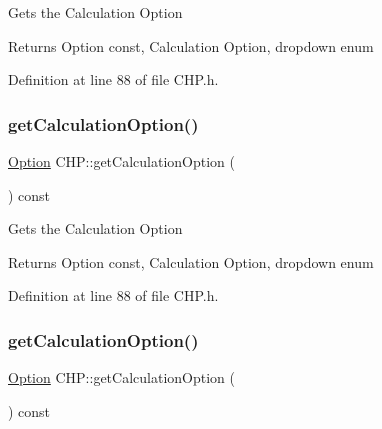 Gets the Calculation Option

\begin{DoxyReturn}{Returns}
Option const, Calculation Option, dropdown enum 
\end{DoxyReturn}


Definition at line 88 of file C\+H\+P.\+h.

\mbox{\label{class_c_h_p_a858f0201818f637331e0d06d3171bee7}} 
\subsubsection{\texorpdfstring{get\+Calculation\+Option()}{getCalculationOption()}\hspace{0.1cm}{\footnotesize\ttfamily [2/3]}}
{\footnotesize\ttfamily \hyperlink{class_c_h_p_ac82f530412021ace928a7e95c1295d06}{Option} C\+H\+P\+::get\+Calculation\+Option (\begin{DoxyParamCaption}{ }\end{DoxyParamCaption}) const\hspace{0.3cm}{\ttfamily [inline]}}

Gets the Calculation Option

\begin{DoxyReturn}{Returns}
Option const, Calculation Option, dropdown enum 
\end{DoxyReturn}


Definition at line 88 of file C\+H\+P.\+h.

\mbox{\label{class_c_h_p_a858f0201818f637331e0d06d3171bee7}} 
\subsubsection{\texorpdfstring{get\+Calculation\+Option()}{getCalculationOption()}\hspace{0.1cm}{\footnotesize\ttfamily [3/3]}}
{\footnotesize\ttfamily \hyperlink{class_c_h_p_ac82f530412021ace928a7e95c1295d06}{Option} C\+H\+P\+::get\+Calculation\+Option (\begin{DoxyParamCaption}{ }\end{DoxyParamCaption}) const\hspace{0.3cm}{\ttfamily [inline]}}

